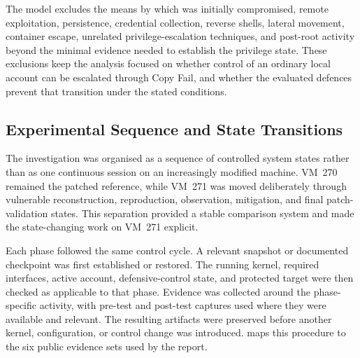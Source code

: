 The model excludes the means by which  was initially compromised,
remote exploitation, persistence, credential collection, reverse shells,
lateral movement, container escape, unrelated privilege-escalation techniques,
and post-root activity beyond the minimal evidence needed to establish the
privilege state. These exclusions keep the analysis focused on whether control
of an ordinary local account can be escalated through Copy Fail, and whether the
evaluated defences prevent that transition under the stated conditions.

\subsection{Experimental Sequence and State Transitions}

The investigation was organised as a sequence of controlled system states
rather than as one continuous session on an increasingly modified machine.
VM~270 remained the patched reference, while VM~271 was moved deliberately
through vulnerable reconstruction, reproduction, observation, mitigation, and
final patch-validation states. This separation provided a stable comparison
system and made the state-changing work on VM~271 explicit.

Each phase followed the same control cycle. A relevant snapshot or documented
checkpoint was first established or restored. The running kernel, required
interfaces, active account, defensive-control state, and protected target were
then checked as applicable to that phase. Evidence was collected around the
phase-specific activity, with pre-test and post-test captures used where they
were available and relevant. The resulting artifacts were preserved before
another kernel, configuration, or control change was introduced.
 maps this procedure to the six public evidence
sets used by the report.

